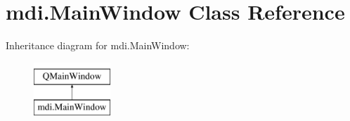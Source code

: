 \hypertarget{classmdi_1_1MainWindow}{}\section{mdi.\+Main\+Window Class Reference}
\label{classmdi_1_1MainWindow}
Inheritance diagram for mdi.\+Main\+Window\+:\begin{figure}[H]
\begin{center}
\leavevmode
\includegraphics[height=2.000000cm]{classmdi_1_1MainWindow}
\end{center}
\end{figure}
